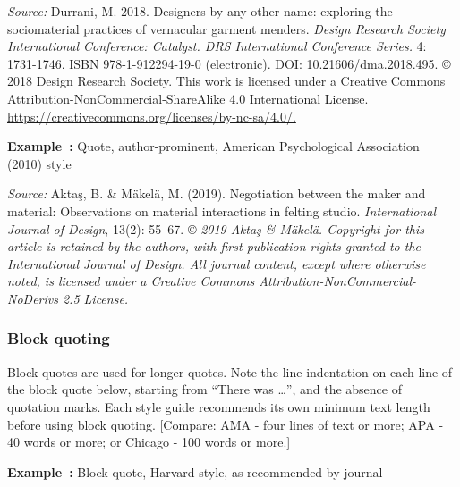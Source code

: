 \documentclass[english, 12pt, a4paper, elec, utf8, a-2b, online]{aaltothesis}
\begin{document}
\vspace{1ex}
\noindent
\textit{Source:} Durrani, M. 2018. Designers by any other name: exploring the 
sociomaterial practices of vernacular garment menders. \textit{Design Research 
Society International Conference: Catalyst. DRS International Conference 
Series.} 4: 1731-1746. ISBN 978-1-912294-19-0 (electronic). 
DOI: 10.21606/dma.2018.495. \copyright{} 2018 Design Research Society. This work
is licensed under a Creative Commons Attribution-NonCommercial-ShareAlike 4.0 
International License. \url{https://creativecommons.org/licenses/by-nc-sa/4.0/.}

\vspace{1em}
\noindent
{}
\textsf{\textbf{Example~\theexample:}} Quote, author-prominent, American 
Psychological Association (2010) style

\vspace{1ex}
\noindent
{}

\vspace{1ex}
\noindent
\textit{Source:} Aktaş, B. \& Mäkelä, M. (2019). Negotiation between the maker 
and material: Observations on material interactions in felting studio. 
\textit{International Journal of Design}, 13(2): 55--67. \copyright{} 
\textit{2019 Aktaş \& Mäkelä. Copyright for this article is retained by the 
	authors, with first publication rights granted to the International Journal 
	of Design. All journal content, except where otherwise noted, is licensed 
	under a Creative Commons Attribution-NonCommercial-NoDerivs 2.5 License.}


\subsubsection*{Block quoting}

Block quotes are used for longer quotes. Note the line indentation on each line 
of the block quote below, starting from “There was \ldots”, and the absence of 
quotation marks. Each style guide recommends its own minimum text length before 
using block quoting. [Compare: AMA - four lines of text or more; APA - 40 words 
or more; or Chicago - 100 words or more.]

\vspace{1em}
\noindent
{}
\textsf{\textbf{Example~\theexample:}} Block quote, Harvard style, as 
recommended by journal
\end{document}
